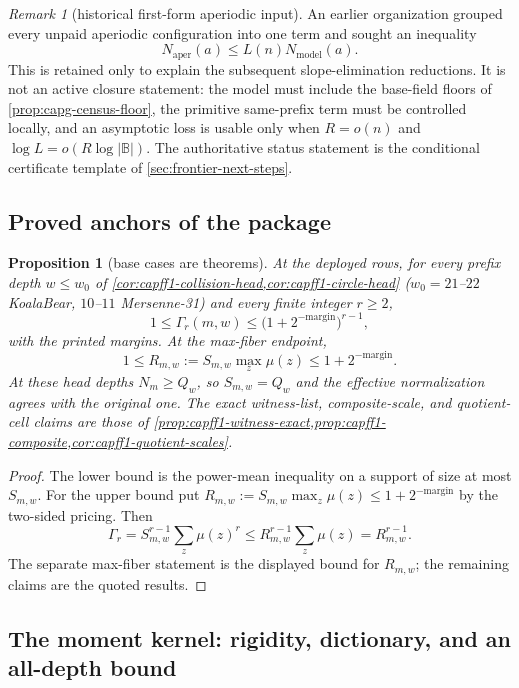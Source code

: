 \documentclass[11pt]{article}
\newtheorem{proposition}[proposition]{Proposition}
\theoremstyle{definition}
\theoremstyle{remark}
\newtheorem{remark}[remark]{Remark}
\newcommand{\B}{\mathbb{B}}
\begin{document}
\begin{remark}[historical first-form aperiodic input]\label{prob:capfp-A}
An earlier organization grouped every unpaid aperiodic configuration into one term and sought an inequality
\[
        N_{\mathrm{aper}}(a)\le L(n)N_{\mathrm{model}}(a).
\]
This is retained only to explain the subsequent slope-elimination reductions.  It is not an active closure statement: the model must include the base-field floors of \cref{prop:capg-census-floor}, the primitive same-prefix term must be controlled locally, and an asymptotic loss is usable only when $R=o(n)$ and $\log L=o(R\log|\B|)$.  The authoritative status statement is the conditional certificate template of \cref{sec:frontier-next-steps}.
\end{remark}

\subsection{Proved anchors of the package}

\begin{proposition}[base cases are theorems]\label{prop:capfp-anchors}
At the deployed rows, for every prefix depth $w\le w_0$ of
\cref{cor:capff1-collision-head,cor:capff1-circle-head}
\textup($w_0=21$--$22$ KoalaBear, $10$--$11$ Mersenne-31\textup) and every finite integer $r\ge2$,
\[
        1\le\Gamma_r(m,w)\le
        \bigl(1+2^{-\mathrm{margin}}\bigr)^{r-1},
\]
with the printed margins.  At the max-fiber endpoint,
\[
        1\le R_{m,w}:=S_{m,w}\max_z\mu(z)
        \le1+2^{-\mathrm{margin}}.
\]
At these head depths $N_m\ge Q_w$, so $S_{m,w}=Q_w$ and the effective normalization agrees with the original one.  The exact witness-list, composite-scale, and quotient-cell claims are those of \cref{prop:capff1-witness-exact,prop:capff1-composite,cor:capff1-quotient-scales}.
\end{proposition}

\begin{proof}
The lower bound is the power-mean inequality on a support of size at most
$S_{m,w}$.  For the upper bound put
$R_{m,w}:=S_{m,w}\max_z\mu(z)\le1+2^{-\mathrm{margin}}$ by the two-sided
pricing.  Then
\[
\Gamma_r=S_{m,w}^{r-1}\sum_z\mu(z)^r
\le R_{m,w}^{r-1}\sum_z\mu(z)=R_{m,w}^{r-1}.
\]
The separate max-fiber statement is the displayed bound for $R_{m,w}$; the remaining claims are the quoted results.
\end{proof}

\subsection{The moment kernel: rigidity, dictionary, and an all-depth bound}
\end{document}
